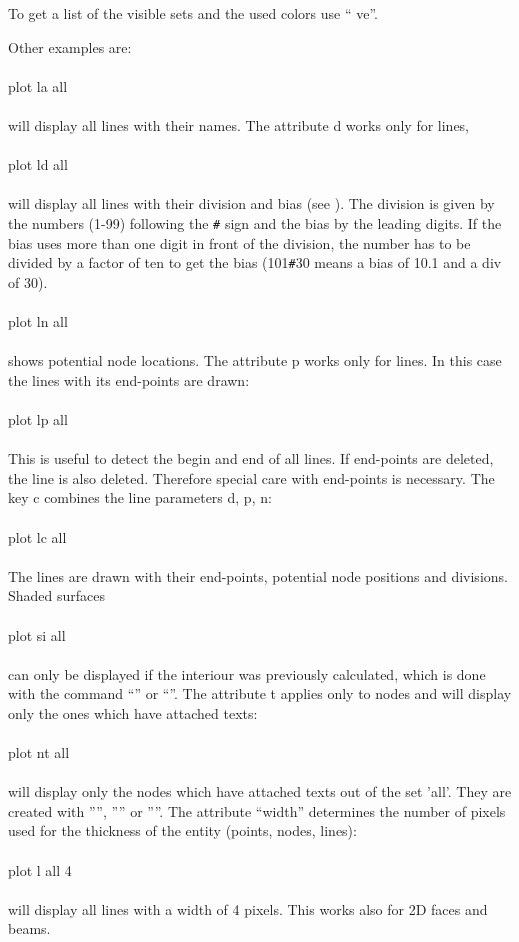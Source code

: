 \documentclass{article}
\begin{document}
To get a list of the visible sets and the used colors use `` ve''.

Other examples are:\\\\plot la all\\\\will display all lines with their names. The attribute d works only for lines,\\\\plot ld all\\\\ will display all lines with their division and bias (see ). The division is given by the numbers (1-99) following the \verb_#_ sign and the bias by the leading digits. If the bias uses more than one digit in front of the division, the number has to be divided by a factor of ten to get the bias (101\verb_#_30 means a bias of 10.1 and a div of 30). \\\\plot ln all\\\\shows potential node locations. The attribute p works only for lines. In this case the lines with its end-points are drawn:\\\\plot lp all\\\\This is useful to detect the begin and end of all lines. If end-points are deleted, the line is also deleted. Therefore special care with end-points is necessary. The key c combines the line parameters d, p, n:\\\\plot lc all\\\\The lines are drawn with their end-points, potential node positions and divisions.
Shaded surfaces\\\\plot si all\\\\ can only be displayed if the interiour was previously calculated, which is done with the command ``'' or ``''. The attribute t applies only to nodes and will display only the ones which have attached texts:\\\\plot nt all\\\\will display only the nodes which have attached texts out of the set 'all'. They are created with '''', '''' or ''''. The attribute ``width'' determines the number of pixels used for the thickness of the entity (points, nodes, lines):\\\\plot l all 4\\\\will display all lines with a width of 4 pixels. This works also for 2D faces and beams.
\end{document}
